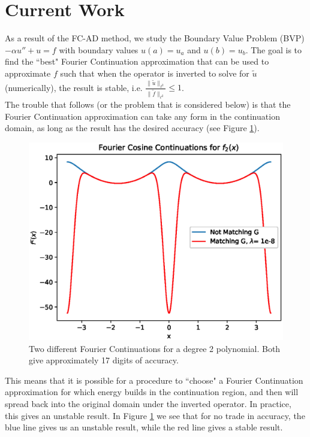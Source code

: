 \documentclass[11pt]{amsart}
\begin{document}
\section{Current Work}
As a result of the FC-AD method, we study the Boundary Value Problem (BVP) $-\alpha u'' + u=f$ with boundary values $u(a)=u_a$ and $u(b)=u_b$.  The goal is to find the ``best" Fourier Continuation approximation that can be used to approximate $f$ such that when the operator is inverted to solve for $\tilde{u}$ (numerically), the result is stable, i.e. $\frac{\|\tilde{u}\|_{\ell^2}}{\|\tilde{f}\|_{\ell^2}} \leq 1$.  \\
The trouble that follows (or the problem that is considered below) is that the Fourier Continuation approximation can take any form in the continuation domain, as long as the result has the desired accuracy (see Figure \ref{fig:Fig1}). \\
\begin{figure}[h!]
\begin{center}
\includegraphics[scale = .7]{f_2ForComparison.eps}
\caption{Two different Fourier Continuations for a degree 2 polynomial. Both give approximately 17 digits of accuracy.}
\label{fig:Fig1}
\end{center}
\end{figure}
This means that it is possible for a procedure to ``choose" a Fourier Continuation approximation for which energy builds in the continuation region, and then will spread back into the original domain under the inverted operator.  In practice, this gives an unstable result.  In Figure \ref{fig:Fig1} we see that for no trade in accuracy, the blue line gives us an unstable result, while the red line gives a stable result. \\
\end{document}
